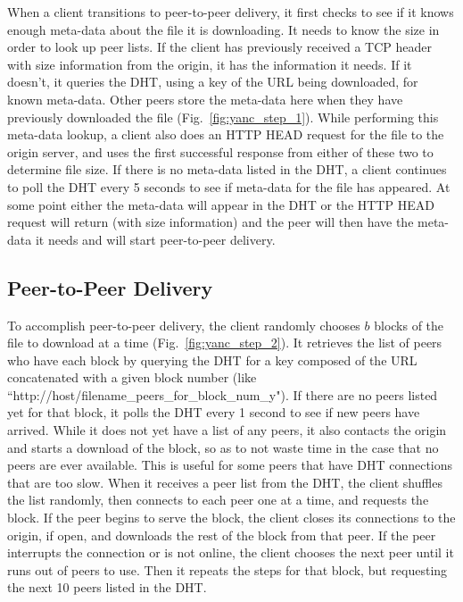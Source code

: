 When a client transitions to peer-to-peer delivery, it first checks to see if it knows enough meta-data about the file it is downloading.  
It needs to know the size in order to look up peer lists.
If the client has previously received a TCP header with size information from the origin, it has the information it needs.  If it doesn't, it
queries the DHT, using a key of the URL being downloaded, for known meta-data.  
Other peers store the meta-data here when they have previously downloaded the file (Fig.~\ref{fig:yanc_step_1}). 
While performing this meta-data lookup, a client also does an HTTP HEAD request for the file to the origin server, 
and uses the first successful response from either of these two to determine file size.  
If there is no meta-data listed in the DHT, a client continues to poll the DHT every 5 seconds to see if meta-data for the file has appeared.  At some point
either the meta-data will appear in the DHT or the HTTP HEAD request will return (with size information) and the peer will then have the meta-data 
it needs and will start  peer-to-peer delivery.

\subsection{Peer-to-Peer Delivery}

To accomplish peer-to-peer delivery, the client randomly chooses $b$ blocks of the file to download at a time (Fig.~\ref{fig:yanc_step_2}).  
It retrieves the list of peers who have each block by querying the DHT for a key composed of
the URL concatenated with a given block number (like ``http://host/filename\_peers\_for\_block\_num\_y").  
If there are no peers listed yet for that block, it polls the DHT every 1 second to see if new peers have arrived.
While it does not yet have a list of any peers, it also contacts the origin and starts a download of the block, so as to 
not waste time in the case that no peers are ever available.  This is useful for some peers that have DHT connections that are too slow.
When it receives a peer list from the DHT, the client shuffles the list randomly, then connects to each peer one at a time, and requests the block.  
If the peer begins to serve the block, the client closes its connections to the origin, if open, and downloads the rest of the block from that peer.  
If the peer interrupts the connection or is not online, the client chooses the next peer until it runs out of peers to use.  
Then it repeats the steps for that block, but requesting the next 10 peers listed in the DHT.

